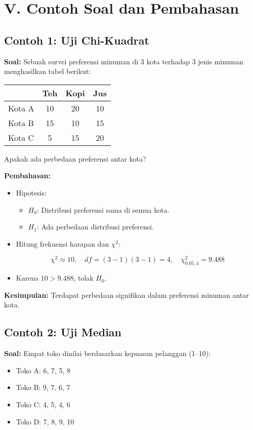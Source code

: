 \documentclass[12pt]{article}
\begin{document}
	\section*{V. Contoh Soal dan Pembahasan}
	
	\subsection*{Contoh 1: Uji Chi-Kuadrat}
	\textbf{Soal:}  
	Sebuah survei preferensi minuman di 3 kota terhadap 3 jenis minuman menghasilkan tabel berikut:
	
	\begin{center}
		\begin{tabular}{lccc}
			\toprule
			& Teh & Kopi & Jus \\
			\midrule
			Kota A & 10 & 20 & 10 \\
			Kota B & 15 & 10 & 15 \\
			Kota C & 5 & 15 & 20 \\
			\bottomrule
		\end{tabular}
	\end{center}
	
	Apakah ada perbedaan preferensi antar kota?
	
	\textbf{Pembahasan:}  
	\begin{itemize}
		\item Hipotesis:
		\begin{itemize}
			\item $H_0$: Distribusi preferensi sama di semua kota.
			\item $H_1$: Ada perbedaan distribusi preferensi.
		\end{itemize}
		\item Hitung frekuensi harapan dan $\chi^2$:
		
		$$
		\chi^2 \approx 10, \quad df = (3-1)(3-1) = 4, \quad \chi^2_{0.05, 4} = 9.488
		$$
		\item Karena $10 > 9.488$, tolak $H_0$.
	\end{itemize}
	\textbf{Kesimpulan:} Terdapat perbedaan signifikan dalam preferensi minuman antar kota.
	
	\subsection*{Contoh 2: Uji Median}
	\textbf{Soal:}  
	Empat toko dinilai berdasarkan kepuasan pelanggan (1–10):
	
	\begin{itemize}
		\item Toko A: 6, 7, 5, 8
		\item Toko B: 9, 7, 6, 7
		\item Toko C: 4, 5, 4, 6
		\item Toko D: 7, 8, 9, 10
	\end{itemize}
	
\end{document}
